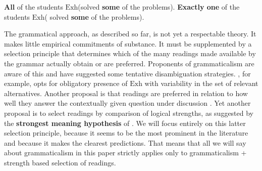 \documentclass[fleqn,reqno,10pt,draft]{article}
\newcommand{\exh}{\ensuremath{\mathrm{Exh}}}
\renewcommand{\mymark}[1]{\textbf{#1}}
\begin{document}
\begin{exe}
  \ex \label{Grammar-Local}
    \begin{xlist}
      \ex \label{Grammar-Local-AE} \mymark{All} of the students \mymark{$\exh$}(solved
        \mymark{some} of the problems).
      \ex \label{Grammar-Local-GE} \mymark{Exactly one} of the
        students \mymark{$\exh$}( solved
        \mymark{some} of the problems).
    \end{xlist}
\end{exe}

The grammatical approach, as described so far, is not yet a
respectable theory. It makes little empirical commitments of
substance. It must be supplemented by a selection principle that
determines which of the many readings made available by the grammar
actually obtain or are preferred. Proponents of grammaticalism are
aware of this and have suggested some tentative disambiguation
strategies. \citet{Magri2011:Another-Argumen}, for example, opts for
obligatory presence of $\exh$ with variability in the set of relevant
alternatives.  Another proposal
is that readings are preferred in relation to how well they answer the
contextually given question under discussion
\citep[e.g.][]{Fox2007:Free-Choice-and,GualminiHulsey2008:The-Question-An}. Yet
another proposal is to select readings by comparison of logical
strengths, as suggested by the \mymark{strongest meaning hypothesis}
of \citet{DalrympleKanazawa1998:Reciprocal-Expr}
\citep[see][]{FoxSpector:Economy-and-Emb,ChierchiaFox2008:The-Grammatical,Chierchia2012:FC-Nominals-and,Spector2014:Global-Positive}. We
will focus entirely on this latter selection principle, because it
seems to be the most prominent in the literature and because it makes
the clearest predictions. That means that all we will say about
grammaticalism in this paper strictly applies only to grammaticalism +
strength based selection of readings.
\end{document}
